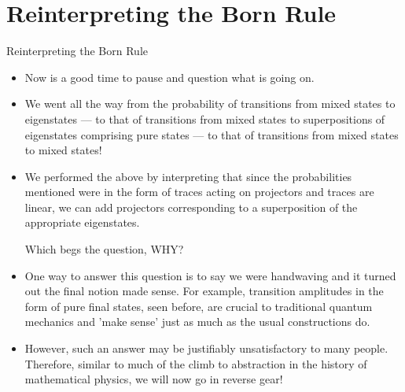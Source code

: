 \documentclass[9pt,handout]{beamer}
\begin{document}
\section{Reinterpreting the Born Rule}
\begin{frame}{Reinterpreting the Born Rule}
\begin{itemize}
\item Now is a good time to pause and question what is going on. 

\item We went all the way from the probability of transitions from mixed states to eigenstates — to that of transitions from mixed states to superpositions of eigenstates comprising pure states — to that of transitions from mixed states to mixed states!

\item We performed the above by interpreting that since the probabilities mentioned were in the form of traces acting on projectors and traces are linear, we can add projectors corresponding to a superposition of the appropriate eigenstates.

Which begs the question, WHY?

\item One way to answer this question is to say we were handwaving and it turned out the final notion made sense. For example, transition amplitudes in the form of pure final states, seen before, are crucial to traditional quantum mechanics and 'make sense' just as much as the usual constructions do.

\item However, such an answer may be justifiably unsatisfactory to many people. Therefore, similar to much of the climb to abstraction in the history of mathematical physics, we will now go in reverse gear!
\end{itemize}
\end{frame}
\end{document}
